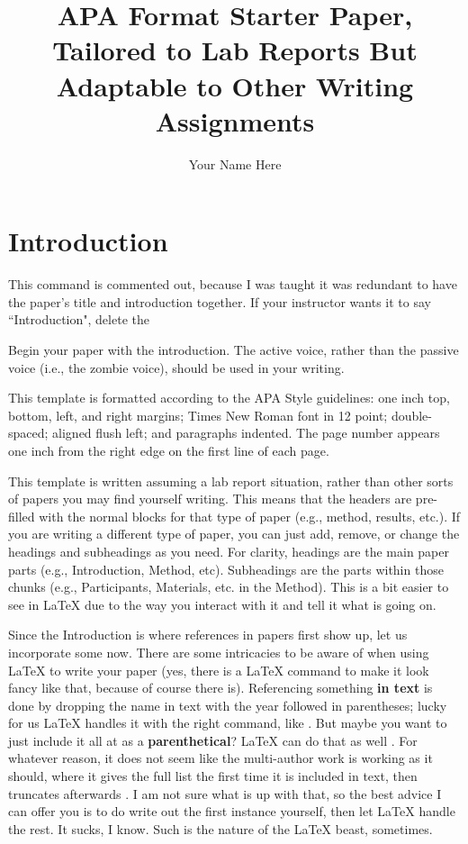 \documentclass[stu,12pt,floatsintext]{apa7}
\title{APA Format Starter Paper, Tailored to Lab Reports But Adaptable to Other Writing Assignments} %
\author{Your Name Here}
\affiliation{Your School}
\begin{document}
\maketitle %

\renewcommand{\labelenumi}{\theenumi.}
\section{Introduction} This command is commented out, because I was taught it was redundant to have the paper's title and introduction together. If your instructor wants it to say ``Introduction", delete the %

Begin your paper with the introduction. The active voice, rather than the passive voice (i.e., the zombie voice), should be used in your writing.

This template is formatted according to the APA Style guidelines: one inch top, bottom, left, and right margins; Times New Roman font in 12 point; double-spaced; aligned flush left; and paragraphs indented. The page number appears one inch from the right edge on the first line of each page.

This template is written assuming a lab report situation, rather than other sorts of papers you may find yourself writing. This means that the headers are pre-filled with the normal blocks for that type of paper (e.g., method, results, etc.). If you are writing a different type of paper, you can just add, remove, or change the headings and subheadings as you need. For clarity, headings are the main paper parts (e.g., Introduction, Method, etc). Subheadings are the parts within those chunks (e.g., Participants, Materials, etc. in the Method). This is a bit easier to see in \LaTeX{} due to the way you interact with it and tell it what is going on.

Since the Introduction is where references in papers first show up, let us incorporate some now. There are some intricacies to be aware of when using \LaTeX{} to write your paper (yes, there is a \LaTeX{} command to make it look fancy like that, because of course there is). Referencing something \textbf{in text} is done by dropping the name in text with the year followed in parentheses; lucky for us \LaTeX{} handles it with the right command, like  \textcite{Sample2024}. But maybe you want to just include it all at as a \textbf{parenthetical}? \LaTeX{} can do that as well \parencite{FullBook2021}. %
For whatever reason, it does not seem like the multi-author work \parencite[e.g.,][]{Multiauthor2020} is working as it should, where it gives the full list the first time it is included in text, then truncates afterwards \parencite{Multiauthor2020}. I am not sure what is up with that, so the best advice I can offer you is to do write out the first instance yourself, then let \LaTeX{} handle the rest. It sucks, I know. Such is the nature of the \LaTeX{} beast, sometimes.
\end{document}
